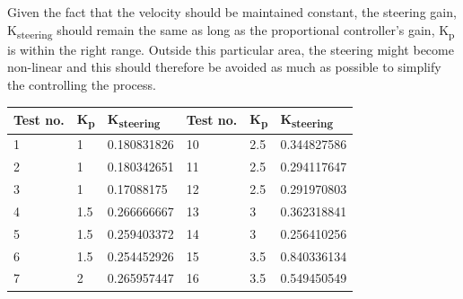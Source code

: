 Given the fact that the velocity should be maintained constant, the steering gain, \si{K_{steering}} should remain the same as long as the proportional controller's gain, \si{K_p} is within the right range. Outside this particular area, the steering might become non-linear and this should therefore be avoided as much as possible to simplify the controlling the process.
%
\begin{table}[H]
\begin{tabular}{|p{2cm}|p{2cm}|p{3cm}|p{2cm}|p{2cm}|p{3cm}|}
\hline%
\textbf{Test no.}  &  \textbf{\si{K_p}} &  \textbf{\si{K_{steering}}}  &  \textbf{Test no.}   &  \textbf{\si{K_p}}  &    \textbf{\si{K_{steering}}}        \\
\hline%
           1    &   1   &   0.180831826   &   10    &     2.5    &           0.344827586              \\
\hline%
           2    &   1   &   0.180342651   &  11    &      2.5    &        0.294117647                 \\
\hline%
           3    &   1   &    0.17088175   &  12    &       2.5     &           0.291970803              \\
\hline%
           4    &   1.5 &   0.266666667   &   13   &       3     &         0.362318841                \\
\hline%
           5    &   1.5 &   0.259403372   &   14   &        3    &         0.256410256                \\
\hline%
           6    &   1.5 &   0.254452926   &    15    &       3.5     &          0.840336134               \\
\hline%
           7    &   2   &  0.265957447    &   16    &          3.5     &            0.549450549             \\

\end{tabular}
\end{table}
